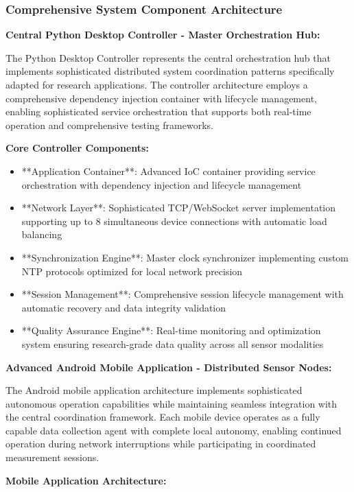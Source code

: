 \documentclass[11pt,a4paper]{report}
\begin{document}
\subsubsection{Comprehensive System Component Architecture}

\textbf{Central Python Desktop Controller - Master Orchestration Hub:}

The Python Desktop Controller represents the central orchestration hub that implements sophisticated distributed system
coordination patterns specifically adapted for research applications. The controller architecture employs a
comprehensive dependency injection container with lifecycle management, enabling sophisticated service orchestration
that supports both real-time operation and comprehensive testing frameworks.

\textbf{Core Controller Components:}

\begin{itemize}
\item **Application Container**: Advanced IoC container providing service orchestration with dependency injection and
  lifecycle management
\item **Network Layer**: Sophisticated TCP/WebSocket server implementation supporting up to 8 simultaneous device
  connections with automatic load balancing
\item **Synchronization Engine**: Master clock synchronizer implementing custom NTP protocols optimized for local network
  precision
\item **Session Management**: Comprehensive session lifecycle management with automatic recovery and data integrity
  validation
\item **Quality Assurance Engine**: Real-time monitoring and optimization system ensuring research-grade data quality across
  all sensor modalities

\end{itemize}
\textbf{Advanced Android Mobile Application - Distributed Sensor Nodes:}

The Android mobile application architecture implements sophisticated autonomous operation capabilities while maintaining
seamless integration with the central coordination framework. Each mobile device operates as a fully capable data
collection agent with complete local autonomy, enabling continued operation during network interruptions while
participating in coordinated measurement sessions.

\textbf{Mobile Application Architecture:}
\end{document}
